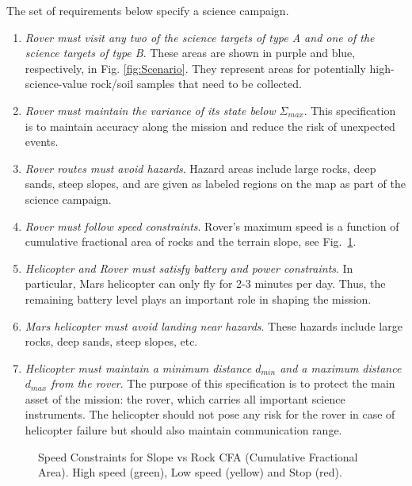 \documentclass[letterpaper]{article} %
\begin{document}
	The set of requirements below specify a science campaign.
	\begin{enumerate}
      \item \textit{Rover must visit any two of the science targets of type A and one of the science targets of type B}. These areas are shown in purple and blue, respectively, in Fig. \ref{fig:Scenario}. They represent areas for potentially high-science-value rock/soil samples that need to be collected.
      \item \textit{Rover must maintain the variance of its state below $\Sigma_{max}$}. This specification is to maintain accuracy along the mission and reduce the risk of unexpected events.
      \item \textit{Rover routes must avoid hazards}. Hazard areas include large rocks, deep sands, steep slopes, and are given as labeled regions on the map as part of the science campaign.
      \item \textit{Rover must follow speed constraints}.
      Rover's maximum speed is a function of cumulative fractional area of rocks and the terrain slope, see Fig.~\ref{fig:SpeedConstriants}.
      \item \textit{Helicopter and Rover must satisfy battery and power constraints}. In particular, Mars helicopter can only fly for 2-3 minutes per day. Thus, the remaining battery level plays an important role in shaping the mission.
      \item \textit{Mars helicopter must avoid landing near hazards}. These hazards include large rocks, deep sands, steep slopes, etc.
      \item \textit{Helicopter must maintain a minimum distance $d_{min}$ and a maximum distance $d_{max}$ from the rover}. The purpose of this specification is to protect the main asset of the mission: the rover, which carries all important science instruments. The helicopter should not pose any risk for the rover in case of helicopter failure but should also maintain communication range.
    \end{enumerate}

    \begin{figure}[h]
	\centering
	\scalebox{.45}{}
	\caption{Speed Constraints for Slope vs Rock CFA (Cumulative Fractional Area). High speed (green), Low speed (yellow) and Stop (red).}
	\label{fig:SpeedConstriants}
    \end{figure}
\end{document}
